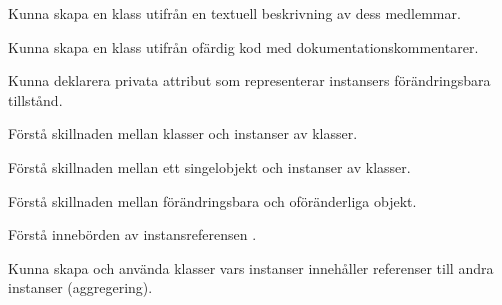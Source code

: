 

\item Kunna skapa en klass utifrån en textuell beskrivning av dess medlemmar.
\item Kunna skapa en klass utifrån ofärdig kod med dokumentationskommentarer.
\item Kunna deklarera privata attribut som representerar instansers förändringsbara tillstånd.
\item Förstå skillnaden mellan klasser och instanser av klasser.
\item Förstå skillnaden mellan ett singelobjekt och instanser av klasser.
\item Förstå skillnaden mellan förändringsbara och oföränderliga objekt.
\item Förstå innebörden av instansreferensen .
\item Kunna skapa och använda klasser vars instanser innehåller referenser till andra instanser (aggregering).